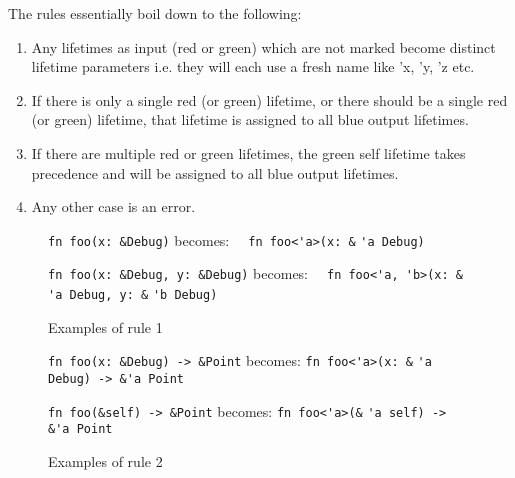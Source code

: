 The rules essentially boil down to the following:
\begin{enumerate}
\item Any lifetimes as input (red or green) which are not marked become distinct lifetime parameters i.e. they will each use a fresh name like 'x, 'y, 'z etc.
\item If there is only a single red (or green) lifetime, or there should be a single red (or green) lifetime, that lifetime is assigned to all blue output lifetimes.
\item If there are multiple red or green lifetimes, the green self lifetime takes precedence and will be assigned to all blue output lifetimes.
\item Any other case is an error.
\end{enumerate}

\begin{figure}
{\verb|fn foo(x: &Debug)|}\newline
becomes:\newline
{\verb|  fn foo<'a>(x: &|}
{\color{red} \verb|'a|}{\verb| Debug)|}

\vspace{4mm}

{\verb|fn foo(x: &Debug, y: &Debug)|}\newline
becomes:\newline
{\verb|  fn foo<'a, 'b>(x: &|}
{\color{red} \verb|'a|}{\verb| Debug, y: &|}{\color{red} \verb|'b|}{\verb| Debug)|}

\caption{Examples of rule 1}
\label{Fig:lifetimes2}
\end{figure}

\begin{figure}
{\verb|fn foo(x: &Debug) -> &Point|}\newline
becomes:
{\verb|fn foo<'a>(x: &|}
{\color{red} \verb|'a|}{\verb| Debug) -> &|}{\color{blue}\verb|'a|}{\verb| Point|}

\vspace{4mm}

{\verb|fn foo(&self) -> &Point|}\newline
becomes:
{\verb|fn foo<'a>(&|}
{\color{green} \verb|'a|}{\verb| self) -> &|}{\color{blue}\verb|'a|}{\verb| Point|}

\caption{Examples of rule 2}
\label{Fig:lifetimes3}
\end{figure}


